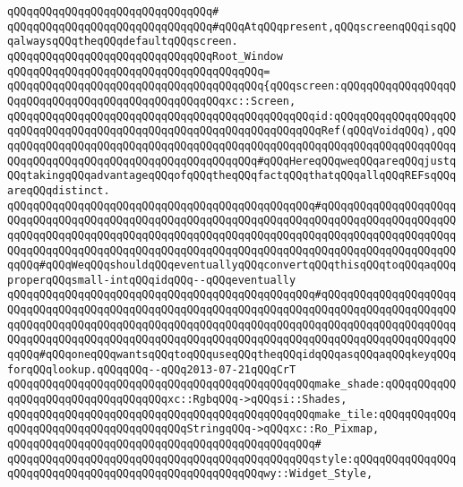 \verb|qQQqqQQqqQQqqQQqqQQqqQQqqQQqqQQq#|\newline
\verb|qQQqqQQqqQQqqQQqqQQqqQQqqQQqqQQq#qQQqAtqQQqpresent,qQQqscreenqQQqisqQQqalwaysqQQqtheqQQqdefaultqQQqscreen.|\newline
\newline
\verb|qQQqqQQqqQQqqQQqqQQqqQQqqQQqqQQqRoot_Window|\newline
\verb|qQQqqQQqqQQqqQQqqQQqqQQqqQQqqQQqqQQqqQQq=|\newline
\verb|qQQqqQQqqQQqqQQqqQQqqQQqqQQqqQQqqQQqqQQq{qQQqscreen:qQQqqQQqqQQqqQQqqQQqqQQqqQQqqQQqqQQqqQQqqQQqqQQqqQQqxc::Screen,|\newline
\verb|qQQqqQQqqQQqqQQqqQQqqQQqqQQqqQQqqQQqqQQqqQQqqQQqid:qQQqqQQqqQQqqQQqqQQqqQQqqQQqqQQqqQQqqQQqqQQqqQQqqQQqqQQqqQQqqQQqqQQqRef(qQQqVoidqQQq),qQQqqQQqqQQqqQQqqQQqqQQqqQQqqQQqqQQqqQQqqQQqqQQqqQQqqQQqqQQqqQQqqQQqqQQqqQQqqQQqqQQqqQQqqQQqqQQqqQQqqQQqqQQqqQQq#qQQqHereqQQqweqQQqareqQQqjustqQQqtakingqQQqadvantageqQQqofqQQqtheqQQqfactqQQqthatqQQqallqQQqREFsqQQqareqQQqdistinct.|\newline
\verb|qQQqqQQqqQQqqQQqqQQqqQQqqQQqqQQqqQQqqQQqqQQqqQQq#qQQqqQQqqQQqqQQqqQQqqQQqqQQqqQQqqQQqqQQqqQQqqQQqqQQqqQQqqQQqqQQqqQQqqQQqqQQqqQQqqQQqqQQqqQQqqQQqqQQqqQQqqQQqqQQqqQQqqQQqqQQqqQQqqQQqqQQqqQQqqQQqqQQqqQQqqQQqqQQqqQQqqQQqqQQqqQQqqQQqqQQqqQQqqQQqqQQqqQQqqQQqqQQqqQQqqQQqqQQqqQQqqQQqqQQqqQQq#qQQqWeqQQqshouldqQQqeventuallyqQQqconvertqQQqthisqQQqtoqQQqaqQQqproperqQQqsmall-intqQQqidqQQq--qQQqeventually|\newline
\verb|qQQqqQQqqQQqqQQqqQQqqQQqqQQqqQQqqQQqqQQqqQQqqQQq#qQQqqQQqqQQqqQQqqQQqqQQqqQQqqQQqqQQqqQQqqQQqqQQqqQQqqQQqqQQqqQQqqQQqqQQqqQQqqQQqqQQqqQQqqQQqqQQqqQQqqQQqqQQqqQQqqQQqqQQqqQQqqQQqqQQqqQQqqQQqqQQqqQQqqQQqqQQqqQQqqQQqqQQqqQQqqQQqqQQqqQQqqQQqqQQqqQQqqQQqqQQqqQQqqQQqqQQqqQQqqQQqqQQqqQQqqQQq#qQQqoneqQQqwantsqQQqtoqQQquseqQQqtheqQQqidqQQqasqQQqaqQQqkeyqQQqforqQQqlookup.qQQqqQQq--qQQq2013-07-21qQQqCrT|\newline
\verb|qQQqqQQqqQQqqQQqqQQqqQQqqQQqqQQqqQQqqQQqqQQqqQQqmake_shade:qQQqqQQqqQQqqQQqqQQqqQQqqQQqqQQqqQQqxc::RgbqQQq->qQQqsi::Shades,|\newline
\verb|qQQqqQQqqQQqqQQqqQQqqQQqqQQqqQQqqQQqqQQqqQQqqQQqmake_tile:qQQqqQQqqQQqqQQqqQQqqQQqqQQqqQQqqQQqqQQqStringqQQq->qQQqxc::Ro_Pixmap,|\newline
\verb|qQQqqQQqqQQqqQQqqQQqqQQqqQQqqQQqqQQqqQQqqQQqqQQq#|\newline
\verb|qQQqqQQqqQQqqQQqqQQqqQQqqQQqqQQqqQQqqQQqqQQqqQQqstyle:qQQqqQQqqQQqqQQqqQQqqQQqqQQqqQQqqQQqqQQqqQQqqQQqqQQqqQQqwy::Widget_Style,|\newline
